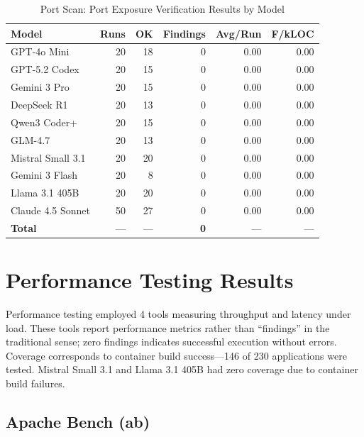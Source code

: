 \begin{table}[htbp]
    \centering
    \caption{Port Scan: Port Exposure Verification Results by Model}
    \label{tab:tool_portscan}
    \small
    \begin{tabular}{@{} l r r r r r @{}}
        \toprule
        \textbf{Model} & \textbf{Runs} & \textbf{OK} & \textbf{Findings} & \textbf{Avg/Run} & \textbf{F/kLOC} \\
        \midrule
        GPT-4o Mini & 20 & 18 & 0 & 0.00 & 0.00 \\
        GPT-5.2 Codex & 20 & 15 & 0 & 0.00 & 0.00 \\
        Gemini 3 Pro & 20 & 15 & 0 & 0.00 & 0.00 \\
        DeepSeek R1 & 20 & 13 & 0 & 0.00 & 0.00 \\
        Qwen3 Coder+ & 20 & 15 & 0 & 0.00 & 0.00 \\
        GLM-4.7 & 20 & 13 & 0 & 0.00 & 0.00 \\
        Mistral Small 3.1 & 20 & 20 & 0 & 0.00 & 0.00 \\
        Gemini 3 Flash & 20 & 8 & 0 & 0.00 & 0.00 \\
        Llama 3.1 405B & 20 & 20 & 0 & 0.00 & 0.00 \\
        Claude 4.5 Sonnet & 50 & 27 & 0 & 0.00 & 0.00 \\
        \midrule
        \textbf{Total} & --- & --- & \textbf{0} & --- & --- \\
        \bottomrule
    \end{tabular}
\end{table}

\section{Performance Testing Results}
\label{sec:performance_results}

Performance testing employed 4 tools measuring throughput and latency under load. These tools report performance metrics rather than ``findings'' in the traditional sense; zero findings indicates successful execution without errors. Coverage corresponds to container build success---146 of 230 applications were tested. Mistral Small 3.1 and Llama 3.1 405B had zero coverage due to container build failures.

\subsection{Apache Bench (ab)}

